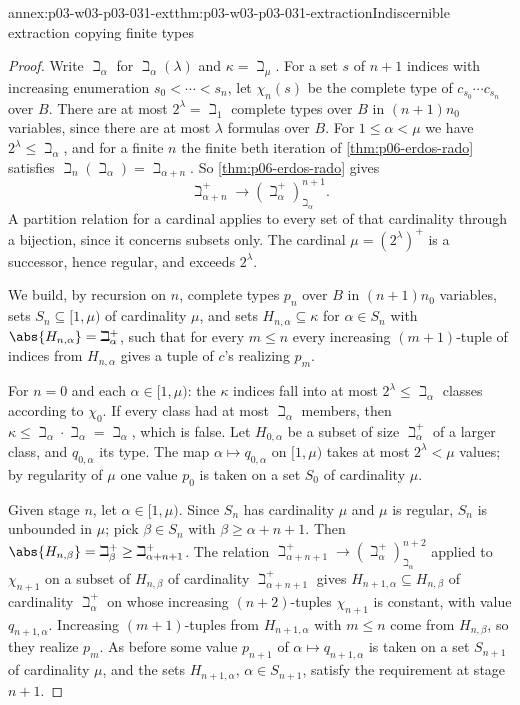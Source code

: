 \begin{annexitem}{annex:p03-w03-p03-031-ext}{thm:p03-w03-p03-031-extraction}{Indiscernible extraction copying finite types}
\begin{proof}
Write \(\beth_\alpha\) for \(\beth_\alpha(\lambda)\) and
\(\kappa=\beth_\mu\).  For a set \(s\) of \(n+1\) indices with increasing
enumeration \(s_0<\cdots<s_n\), let \(\chi_n(s)\) be the complete type
of \(c_{s_0}\cdots c_{s_n}\) over \(B\).  There are at most
\(2^\lambda=\beth_1\) complete types over \(B\) in \((n+1)n_0\) variables,
since there are at most \(\lambda\) formulas over \(B\).  For
\(1\leq\alpha<\mu\) we have \(2^\lambda\leq\beth_\alpha\), and for a
finite \(n\) the finite beth iteration of
\cref{thm:p06-erdos-rado} satisfies
\(\beth_n(\beth_\alpha)=\beth_{\alpha+n}\).  So
\cref{thm:p06-erdos-rado} gives
\[
 \beth_{\alpha+n}^+\longrightarrow(\beth_\alpha^+)^{n+1}_{\beth_\alpha}.
\]
A partition relation for a cardinal applies to every set of that
cardinality through a bijection, since it concerns subsets only.  The
cardinal \(\mu=(2^\lambda)^+\) is a successor, hence regular, and exceeds
\(2^\lambda\).

We build, by recursion on \(n\), complete types \(p_n\) over \(B\) in
\((n+1)n_0\) variables, sets \(S_n\subseteq[1,\mu)\) of cardinality
\(\mu\), and sets \(H_{n,\alpha}\subseteq\kappa\) for \(\alpha\in S_n\) with
\(\abs{H_{n,\alpha}}=\beth_\alpha^+\), such that for every \(m\leq n\) every
increasing \((m+1)\)-tuple of indices from \(H_{n,\alpha}\) gives a tuple
of \(c\)'s realizing \(p_m\).

For \(n=0\) and each \(\alpha\in[1,\mu)\): the \(\kappa\) indices fall into
at most \(2^\lambda\leq\beth_\alpha\) classes according to
\(\chi_0\).  If every class had at most \(\beth_\alpha\) members, then
\(\kappa\leq\beth_\alpha\cdot\beth_\alpha=\beth_\alpha\), which is false.
Let \(H_{0,\alpha}\) be a subset of size \(\beth_\alpha^+\) of a larger
class, and \(q_{0,\alpha}\) its type.  The map
\(\alpha\mapsto q_{0,\alpha}\) on \([1,\mu)\) takes at most \(2^\lambda<\mu\)
values; by regularity of \(\mu\) one value \(p_0\) is taken on a set
\(S_0\) of cardinality \(\mu\).

Given stage \(n\), let \(\alpha\in[1,\mu)\).  Since \(S_n\) has cardinality
\(\mu\) and \(\mu\) is regular, \(S_n\) is unbounded in \(\mu\); pick
\(\beta\in S_n\) with \(\beta\geq\alpha+n+1\).  Then
\(\abs{H_{n,\beta}}=\beth_\beta^+\geq\beth_{\alpha+n+1}^+\).  The relation
\(\beth_{\alpha+n+1}^+\to(\beth_\alpha^+)^{n+2}_{\beth_\alpha}\) applied to
\(\chi_{n+1}\) on a subset of \(H_{n,\beta}\) of cardinality
\(\beth_{\alpha+n+1}^+\) gives \(H_{n+1,\alpha}\subseteq H_{n,\beta}\) of
cardinality \(\beth_\alpha^+\) on whose increasing \((n+2)\)-tuples
\(\chi_{n+1}\) is constant, with value \(q_{n+1,\alpha}\).  Increasing
\((m+1)\)-tuples from \(H_{n+1,\alpha}\) with \(m\leq n\) come from
\(H_{n,\beta}\), so they realize \(p_m\).  As before some value
\(p_{n+1}\) of \(\alpha\mapsto q_{n+1,\alpha}\) is taken on a set
\(S_{n+1}\) of cardinality \(\mu\), and the sets \(H_{n+1,\alpha}\),
\(\alpha\in S_{n+1}\), satisfy the requirement at stage \(n+1\).


\end{proof}
\end{annexitem}
